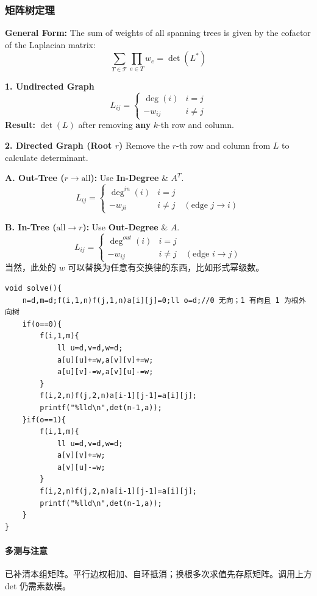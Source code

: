 \subsubsection{矩阵树定理}

\textbf{General Form:}
The sum of weights of all spanning trees is given by the cofactor of the Laplacian matrix:
\[ \sum_{T \in \mathcal{T}} \prod_{e \in T} w_e = \det(L^*) \]

\textbf{1. Undirected Graph}
\[
L_{ij} = \begin{cases}
\deg(i) & i = j \\
-w_{ij} & i \neq j
\end{cases}
\]
\textbf{Result:} $\det(L)$ after removing \textbf{any} $k$-th row and column.

\textbf{2. Directed Graph (Root $r$)}
Remove the $r$-th row and column from $L$ to calculate determinant.

\noindent \textbf{A. Out-Tree ($r \to \text{all}$):} Use \textbf{In-Degree} \& $A^T$.
\[
L_{ij} = \begin{cases}
\deg^{in}(i) & i = j \\
-w_{ji} & i \neq j \quad (\text{edge } j \to i)
\end{cases}
\]

\noindent \textbf{B. In-Tree ($\text{all} \to r$):} Use \textbf{Out-Degree} \& $A$.
\[
L_{ij} = \begin{cases}
\deg^{out}(i) & i = j \\
-w_{ij} & i \neq j \quad (\text{edge } i \to j)
\end{cases}
\]
当然，此处的 $w$ 可以替换为任意有交换律的东西，比如形式幂级数。

\begin{lstlisting}
void solve(){
    n=d,m=d;f(i,1,n)f(j,1,n)a[i][j]=0;ll o=d;//0 无向；1 有向且 1 为根外向树
    if(o==0){
        f(i,1,m){
            ll u=d,v=d,w=d;
            a[u][u]+=w,a[v][v]+=w;
            a[u][v]-=w,a[v][u]-=w;
        }
        f(i,2,n)f(j,2,n)a[i-1][j-1]=a[i][j];
        printf("%lld\n",det(n-1,a));
    }if(o==1){
        f(i,1,m){
            ll u=d,v=d,w=d;
            a[v][v]+=w;
            a[v][u]-=w;
        }
        f(i,2,n)f(j,2,n)a[i-1][j-1]=a[i][j];
        printf("%lld\n",det(n-1,a));
    }
}
\end{lstlisting}

\paragraph{多测与注意} 已补清本组矩阵。平行边权相加、自环抵消；换根多次求值先存原矩阵。调用上方 det 仍需素数模。
